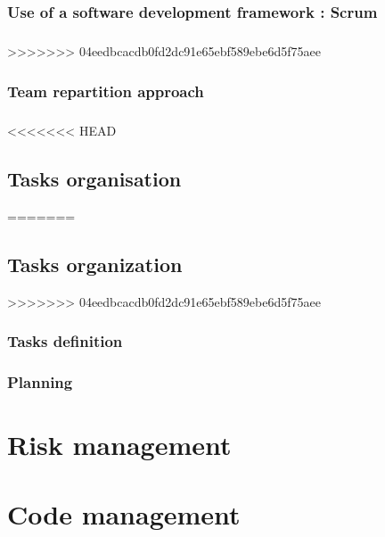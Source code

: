 \documentclass{report}
\begin{document}
\subsection{Use of a software development framework : Scrum}

\paragraph{}
\hspace{4mm}\textnormal{}
>>>>>>> 04eedbcacdb0fd2dc91e65ebf589ebe6d5f75aee

\subsection{Team repartition approach}

\paragraph{}
\hspace{4mm}\textnormal{}

<<<<<<< HEAD
\section{Tasks organisation}
=======
\section{Tasks organization}
>>>>>>> 04eedbcacdb0fd2dc91e65ebf589ebe6d5f75aee

\subsection{Tasks definition}

\subsection{Planning}


\chapter{Risk management}


\chapter{Code management}
\end{document}

